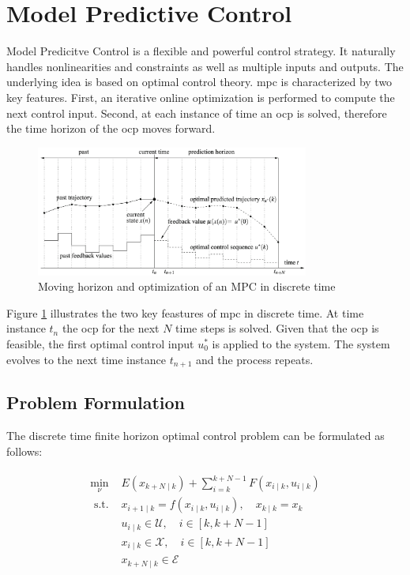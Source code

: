 \documentclass[10pt,a4paper,titlepage]{article}
\begin{document}
\section{Model Predictive Control}
\label{sec:mpc}
Model Predicitve Control is a flexible and powerful control strategy. It naturally handles nonlinearities and constraints as
well as multiple inputs and outputs. The underlying idea is based on optimal control theory. \gls{mpc} is characterized by
two key features. First, an iterative online optimization is performed to compute the next control input. Second, at each 
instance of time an \gls{ocp} is solved, therefore the time horizon of the \gls{ocp} moves forward. \cite{nmpcBible}

\begin{figure}[h]
	\begin{center}
		\includegraphics[width=0.8\textwidth]{img/nmpc_idea.png}
		\caption{Moving horizon and optimization of an MPC in discrete time \cite{nmpcBible}}
		\label{pic:nmpc_idea}
	\end{center}
\end{figure}

Figure \ref{pic:nmpc_idea} illustrates the two key feastures of \gls{mpc} in discrete time. At time instance $t_n$ 
the \gls{ocp} for the next $N$ time steps is solved. Given that the \gls{ocp} is feasible, the first optimal control
input $u^*_0$ is applied to the system. The system evolves to the next time instance $t_{n+1}$ and the process repeats.

\subsection{Problem Formulation}
The discrete time finite horizon optimal control problem can be formulated as follows:

\begin{align}
\label{eq:mpc_problem}
    \begin{array}{ll}
        \min\limits_{\nu} & E\left(x_{k+N \mid k}\right)+\sum_{i=k}^{k+N-1} F\left(x_{i \mid k}, u_{i \mid k}\right) \\[2em]
        \text { s.t. } & x_{i+1 \mid k}=f\left(x_{i \mid k}, u_{i \mid k}\right), \quad x_{k \mid k}=x_k\\
        & u_{i \mid k} \in \mathcal{U}, \quad i \in[k, k+N-1]\\
        & x_{i \mid k} \in \mathcal{X}, \quad i \in[k, k+N-1]\\
        & x_{k+N \mid k} \in \mathcal{E}
    \end{array}
\end{align}
\end{document}
